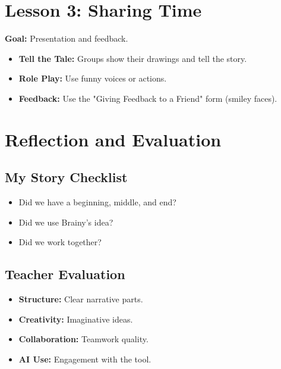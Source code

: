 \documentclass[11pt, a4paper]{article}
\begin{document}
\section{Lesson 3: Sharing Time}
\textbf{Goal:} Presentation and feedback.
\begin{itemize}
    \item \textbf{Tell the Tale:} Groups show their drawings and tell the story.
    \item \textbf{Role Play:} Use funny voices or actions.
    \item \textbf{Feedback:} Use the "Giving Feedback to a Friend" form (smiley faces).
\end{itemize}

\section{Reflection and Evaluation}
\subsection*{My Story Checklist}
\begin{itemize}
    \item Did we have a beginning, middle, and end?
    \item Did we use Brainy's idea?
    \item Did we work together?
\end{itemize}

\subsection*{Teacher Evaluation}
\begin{itemize}
    \item \textbf{Structure:} Clear narrative parts.
    \item \textbf{Creativity:} Imaginative ideas.
    \item \textbf{Collaboration:} Teamwork quality.
    \item \textbf{AI Use:} Engagement with the tool.
\end{itemize}
\end{document}
